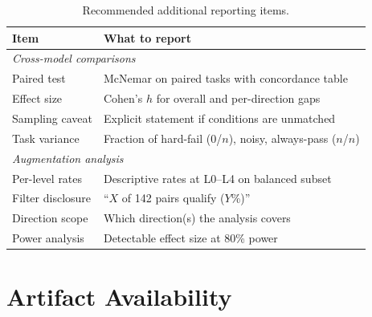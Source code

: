 \begin{table}[htbp]
\centering
\caption{Recommended additional reporting items.}
\label{tab:reporting-recommended}
\small
\begin{tabularx}{\columnwidth}{@{}p{2.3cm}X@{}}
\toprule
Item & What to report \\
\midrule
\multicolumn{2}{l}{\textit{Cross-model comparisons}} \\
Paired test & McNemar on paired tasks with concordance table \\
Effect size & Cohen's $h$ for overall and per-direction gaps \\
Sampling caveat & Explicit statement if conditions are unmatched \\
Task variance & Fraction of hard-fail (0/$n$), noisy, always-pass ($n$/$n$) \\
\midrule
\multicolumn{2}{l}{\textit{Augmentation analysis}} \\
Per-level rates & Descriptive rates at L0--L4 on balanced subset \\
Filter disclosure & ``$X$ of 142 pairs qualify ($Y$\%)'' \\
Direction scope & Which direction(s) the analysis covers \\
Power analysis & Detectable effect size at 80\% power \\
\bottomrule
\end{tabularx}
\end{table}


\section{Artifact Availability}
\label{sec:artifact-availability}

